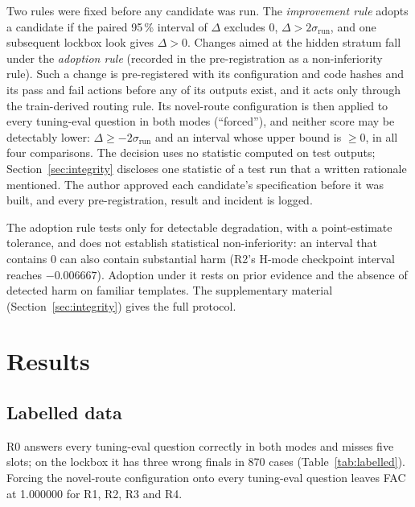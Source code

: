 \documentclass[conference]{IEEEtran}
\begin{document}
Two rules were fixed before any candidate was run. The \emph{improvement rule} adopts a candidate if the paired 95\,\% interval of $\Delta$ excludes 0, $\Delta>2\sigma_{\mathrm{run}}$, and one subsequent lockbox look gives $\Delta>0$. Changes aimed at the hidden stratum fall under the \emph{adoption rule} (recorded in the pre-registration as a non-inferiority rule). Such a change is pre-registered with its configuration and code hashes and its pass and fail actions before any of its outputs exist, and it acts only through the train-derived routing rule. Its novel-route configuration is then applied to every tuning-eval question in both modes (``forced''), and neither score may be detectably lower: $\Delta\ge-2\sigma_{\mathrm{run}}$ and an interval whose upper bound is $\ge0$, in all four comparisons. The decision uses no statistic computed on test outputs; Section~\ref{sec:integrity} discloses one statistic of a test run that a written rationale mentioned. The author approved each candidate's specification before it was built, and every pre-registration, result and incident is logged.

The adoption rule tests only for detectable degradation, with a point-estimate tolerance, and does not establish statistical non-inferiority: an interval that contains 0 can also contain substantial harm (R2's H-mode checkpoint interval reaches $-0.006667$). Adoption under it rests on prior evidence and the absence of detected harm on familiar templates. The supplementary material (Section~\ref{sec:integrity}) gives the full protocol.

\section{Results}\label{sec:results}




\subsection{Labelled data}
R0 answers every tuning-eval question correctly in both modes and misses five slots; on the lockbox it has three wrong finals in 870 cases (Table~\ref{tab:labelled}). Forcing the novel-route configuration onto every tuning-eval question leaves FAC at 1.000000 for R1, R2, R3 and R4.
\end{document}
